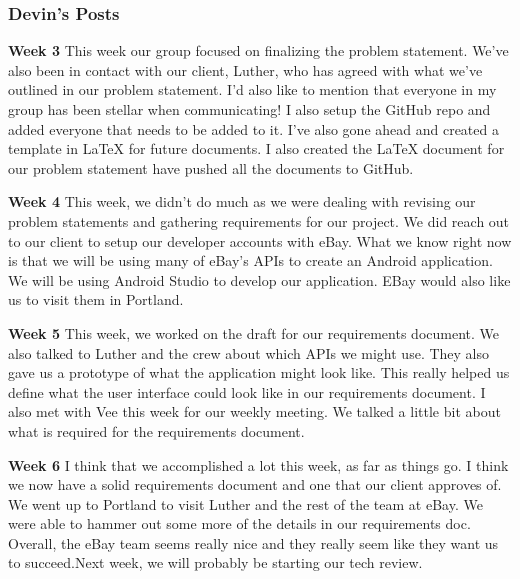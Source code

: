 \documentclass[journal,compsoc, 10pt, draftclsnofoot, onecolumn]{IEEEtran}
\begin{document}
\subsubsection*{Devin's Posts}
\textbf{Week 3}\newline
This week our group focused on finalizing the problem statement. We've also been in 
contact with our client, Luther, who has agreed with what we've outlined in our 
problem statement. I'd also like to mention that everyone in my group has been 
stellar when communicating!
I also setup the GitHub repo and added everyone that needs to be added to it. 
I've also gone ahead and created a template in LaTeX for future documents. I also 
created the LaTeX document for our problem statement have pushed all the
 documents to GitHub.\newline

\textbf{Week 4}\newline
This week, we didn't do much as we were dealing with revising our problem statements 
and gathering requirements for our project. We did reach out to our client to setup 
our developer accounts with eBay. What we know right now is that we will be using 
many of eBay's APIs to create an Android application. We will be using Android Studio 
to develop our application. EBay would also like us to visit them in Portland.\newline

\textbf{Week 5}\newline
This week, we worked on the draft for our requirements document. We also talked to 
Luther and the crew about which APIs we might use. They also gave us a prototype 
of what the application might look like. This really helped us define what the user 
interface could look like in our requirements document. I also met with Vee this week 
for our weekly meeting. We talked a little bit about what is required for the 
requirements document.\newline

\textbf{Week 6}\newline
I think that we accomplished a lot this week, as far as things go. I think we now have
 a solid requirements document and one that our client approves of. We went up to
  Portland to visit Luther and the rest of the team at eBay. We were able to hammer 
  out some more of the details in our requirements doc. Overall, the eBay team seems 
  really nice and they really seem like they want us to succeed.Next week, we will 
  probably be starting our tech review.\newline
\end{document}
